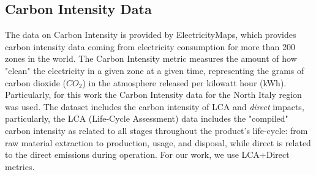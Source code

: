 \subsection{Carbon Intensity Data}
The data on Carbon Intensity is provided by ElectricityMaps, which provides carbon intensity data coming from electricity consumption for more than 200 zones in the world.
The Carbon Intensity metric measures the amount of how "clean" the electricity in a given zone at a given time, representing the grams of carbon dioxide ($CO_2$) in the atmosphere released per kilowatt hour (kWh).
Particularly, for this work the Carbon Intensity data for the North Italy region was used.
The dataset includes the carbon intensity of LCA and \textit{direct} \cite{CarbonIntensity} impacts, particularly, the LCA (Life-Cycle Assessment) data includes the "compiled" carbon intensity as related to all stages throughout the product’s life-cycle:
from raw material extraction to production, usage, and disposal, while direct is related to the direct emissions during operation. For our work, we use LCA+Direct metrics.